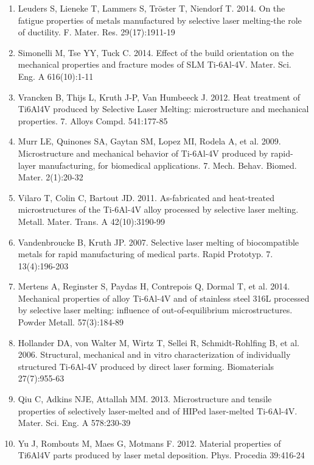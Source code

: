 \documentclass[10pt]{article}
\begin{document}
\begin{enumerate}
  \item Leuders S, Lieneke T, Lammers S, Tröster T, Niendorf T. 2014. On the fatigue properties of metals manufactured by selective laser melting-the role of ductility. F. Mater. Res. 29(17):1911-19

  \item Simonelli M, Tse YY, Tuck C. 2014. Effect of the build orientation on the mechanical properties and fracture modes of SLM Ti-6Al-4V. Mater. Sci. Eng. A 616(10):1-11

  \item Vrancken B, Thijs L, Kruth J-P, Van Humbeeck J. 2012. Heat treatment of Ti6Al4V produced by Selective Laser Melting: microstructure and mechanical properties. 7. Alloys Compd. 541:177-85

  \item Murr LE, Quinones SA, Gaytan SM, Lopez MI, Rodela A, et al. 2009. Microstructure and mechanical behavior of Ti-6Al-4V produced by rapid-layer manufacturing, for biomedical applications. 7. Mech. Behav. Biomed. Mater. 2(1):20-32

  \item Vilaro T, Colin C, Bartout JD. 2011. As-fabricated and heat-treated microstructures of the Ti-6Al-4V alloy processed by selective laser melting. Metall. Mater. Trans. A 42(10):3190-99

  \item Vandenbroucke B, Kruth JP. 2007. Selective laser melting of biocompatible metals for rapid manufacturing of medical parts. Rapid Prototyp. 7. 13(4):196-203

  \item Mertens A, Reginster S, Paydas H, Contrepois Q, Dormal T, et al. 2014. Mechanical properties of alloy Ti-6Al-4V and of stainless steel 316L processed by selective laser melting: influence of out-of-equilibrium microstructures. Powder Metall. 57(3):184-89

  \item Hollander DA, von Walter M, Wirtz T, Sellei R, Schmidt-Rohlfing B, et al. 2006. Structural, mechanical and in vitro characterization of individually structured Ti-6Al-4V produced by direct laser forming. Biomaterials 27(7):955-63

  \item Qiu C, Adkins NJE, Attallah MM. 2013. Microstructure and tensile properties of selectively laser-melted and of HIPed laser-melted Ti-6Al-4V. Mater. Sci. Eng. A 578:230-39

  \item Yu J, Rombouts M, Maes G, Motmans F. 2012. Material properties of Ti6Al4V parts produced by laser metal deposition. Phys. Procedia 39:416-24


\end{enumerate}
\end{document}
